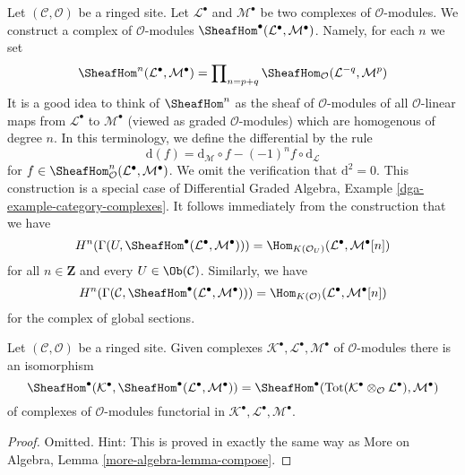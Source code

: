 \noindent
Let $(\mathcal{C}, \mathcal{O})$ be a ringed site. Let
$\mathcal{L}^\bullet$ and $\mathcal{M}^\bullet$ be two complexes
of $\mathcal{O}$-modules. We construct a complex
of $\mathcal{O}$-modules
$\SheafHom^\bullet(\mathcal{L}^\bullet, \mathcal{M}^\bullet)$.
Namely, for each $n$ we set
$$
\SheafHom^n(\mathcal{L}^\bullet, \mathcal{M}^\bullet) =
\prod\nolimits_{n = p + q}
\SheafHom_\mathcal{O}(\mathcal{L}^{-q}, \mathcal{M}^p)
$$
It is a good idea to think of $\SheafHom^n$ as the
sheaf of $\mathcal{O}$-modules of all $\mathcal{O}$-linear
maps from $\mathcal{L}^\bullet$ to $\mathcal{M}^\bullet$
(viewed as graded $\mathcal{O}$-modules) which are homogenous
of degree $n$. In this terminology, we define the differential by the rule
$$
\text{d}(f) =
\text{d}_\mathcal{M} \circ f - (-1)^n f \circ \text{d}_\mathcal{L}
$$
for
$f \in \SheafHom^n_\mathcal{O}(\mathcal{L}^\bullet, \mathcal{M}^\bullet)$.
We omit the verification that $\text{d}^2 = 0$.
This construction is a special case of
Differential Graded Algebra, Example \ref{dga-example-category-complexes}.
It follows immediately from the construction that we have
\begin{equation}
\label{equation-cohomology-hom-complex}
H^n(\Gamma(U, \SheafHom^\bullet(\mathcal{L}^\bullet, \mathcal{M}^\bullet))) =
\Hom_{K(\mathcal{O}_U)}(\mathcal{L}^\bullet, \mathcal{M}^\bullet[n])
\end{equation}
for all $n \in \mathbf{Z}$ and every $U \in \Ob(\mathcal{C})$. Similarly,
we have
\begin{equation}
\label{equation-global-cohomology-hom-complex}
H^n(\Gamma(\mathcal{C},
\SheafHom^\bullet(\mathcal{L}^\bullet, \mathcal{M}^\bullet))) =
\Hom_{K(\mathcal{O})}(\mathcal{L}^\bullet, \mathcal{M}^\bullet[n])
\end{equation}
for the complex of global sections.

\begin{lemma}
\label{lemma-compose}
Let $(\mathcal{C}, \mathcal{O})$ be a ringed site.
Given complexes $\mathcal{K}^\bullet, \mathcal{L}^\bullet, \mathcal{M}^\bullet$
of $\mathcal{O}$-modules there is an isomorphism
$$
\SheafHom^\bullet(\mathcal{K}^\bullet,
\SheafHom^\bullet(\mathcal{L}^\bullet, \mathcal{M}^\bullet))
=
\SheafHom^\bullet(\text{Tot}(\mathcal{K}^\bullet \otimes_\mathcal{O}
\mathcal{L}^\bullet), \mathcal{M}^\bullet)
$$
of complexes of $\mathcal{O}$-modules functorial in
$\mathcal{K}^\bullet, \mathcal{L}^\bullet, \mathcal{M}^\bullet$.
\end{lemma}

\begin{proof}
Omitted. Hint: This is proved in exactly the same way as
More on Algebra, Lemma \ref{more-algebra-lemma-compose}.
\end{proof}

